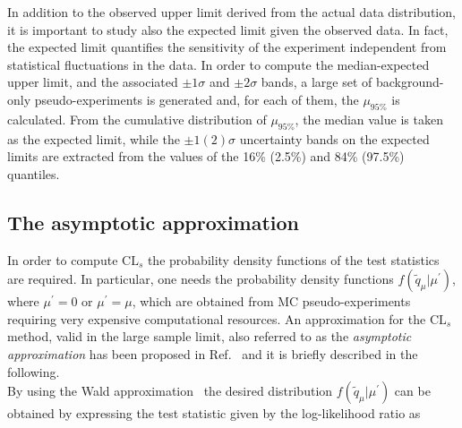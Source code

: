 In addition to the observed upper limit derived from the actual data distribution, it is important to study also the expected limit given the observed data.
In fact, the expected limit quantifies the sensitivity of the experiment independent from statistical fluctuations in the data.
In order to compute the median-expected upper limit, and the associated $\pm 1\sigma$ and $\pm 2\sigma$ bands,
a large set of background-only pseudo-experiments is generated and, for each of them, the $\mu_{95\%}$ is calculated.
From the cumulative distribution of $\mu_{95\%}$, the median value is taken as the expected limit, while the $\pm 1(2)\sigma$ uncertainty bands on the expected limits
are extracted from the values of the 16\% (2.5\%) and 84\% (97.5\%) quantiles.

\subsection{The asymptotic approximation}\label{subsec:AsymptCLs}

In order to compute $\mathrm{CL}_s$ the probability density functions of the test statistics are required.
In particular, one needs the probability density functions $f(\tilde{q}_\mu|\mu^\prime)$, where $\mu^\prime = 0$ or $\mu^\prime = \mu$,
which are obtained from MC pseudo-experiments requiring very expensive computational resources.
An approximation for the $\mathrm{CL}_s$ method, valid in the large sample limit, also referred to as the \textit{asymptotic approximation} has been proposed in Ref.~\cite{AsymptCLs}
and it is briefly described in the following.\\

By using the Wald approximation~\cite{10.2307/1990256} the desired distribution $f(\tilde{q}_\mu|\mu^\prime)$ can be obtained by expressing the test statistic given by the log-likelihood ratio as


